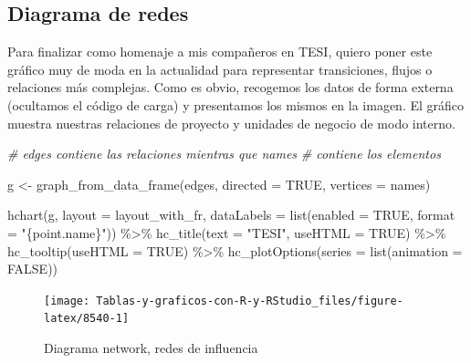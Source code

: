 \documentclass[
]{book}
\newenvironment{Shaded}{\begin{snugshade}}{\end{snugshade}}
\newcommand{\AttributeTok}[1]{\textcolor[rgb]{0.77,0.63,0.00}{#1}}
\newcommand{\CommentTok}[1]{\textcolor[rgb]{0.56,0.35,0.01}{\textit{#1}}}
\newcommand{\ConstantTok}[1]{\textcolor[rgb]{0.00,0.00,0.00}{#1}}
\newcommand{\FunctionTok}[1]{\textcolor[rgb]{0.00,0.00,0.00}{#1}}
\newcommand{\NormalTok}[1]{#1}
\newcommand{\OtherTok}[1]{\textcolor[rgb]{0.56,0.35,0.01}{#1}}
\newcommand{\SpecialCharTok}[1]{\textcolor[rgb]{0.00,0.00,0.00}{#1}}
\newcommand{\StringTok}[1]{\textcolor[rgb]{0.31,0.60,0.02}{#1}}
\begin{document}
\hypertarget{diagrama-de-redes}{%
\subsection{Diagrama de redes}\label{diagrama-de-redes}}

Para finalizar como homenaje a mis compañeros en TESI, quiero poner este gráfico muy de moda en la actualidad para representar transiciones, flujos o relaciones más complejas. Como es obvio, recogemos los datos de forma externa (ocultamos el código de carga) y presentamos los mismos en la imagen. El gráfico muestra nuestras relaciones de proyecto y unidades de negocio de modo interno.

\begin{Shaded}
\begin{Highlighting}[]
\CommentTok{\# edges contiene las relaciones mientras que names}
\CommentTok{\# contiene los elementos}

\NormalTok{g }\OtherTok{\textless{}{-}} \FunctionTok{graph\_from\_data\_frame}\NormalTok{(edges, }\AttributeTok{directed =} \ConstantTok{TRUE}\NormalTok{, }\AttributeTok{vertices =}\NormalTok{ names)}

\FunctionTok{hchart}\NormalTok{(g, }\AttributeTok{layout =}\NormalTok{ layout\_with\_fr, }\AttributeTok{dataLabels =} \FunctionTok{list}\NormalTok{(}\AttributeTok{enabled =} \ConstantTok{TRUE}\NormalTok{,}
  \AttributeTok{format =} \StringTok{"\{point.name\}"}\NormalTok{)) }\SpecialCharTok{\%\textgreater{}\%}
  \FunctionTok{hc\_title}\NormalTok{(}\AttributeTok{text =} \StringTok{"TESI"}\NormalTok{, }\AttributeTok{useHTML =} \ConstantTok{TRUE}\NormalTok{) }\SpecialCharTok{\%\textgreater{}\%}
  \FunctionTok{hc\_tooltip}\NormalTok{(}\AttributeTok{useHTML =} \ConstantTok{TRUE}\NormalTok{) }\SpecialCharTok{\%\textgreater{}\%}
  \FunctionTok{hc\_plotOptions}\NormalTok{(}\AttributeTok{series =} \FunctionTok{list}\NormalTok{(}\AttributeTok{animation =} \ConstantTok{FALSE}\NormalTok{))}
\end{Highlighting}
\end{Shaded}

\begin{figure}[H]

{\centering \texttt{[image: Tablas-y-graficos-con-R-y-RStudio\_files/figure-latex/8540-1]} 

}

\caption{Diagrama network, redes de influencia}\label{fig:8540}
\end{figure}
\end{document}
